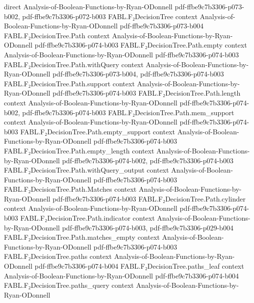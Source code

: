 \begin{theorem}
  {direct}
  {Analysis-of-Boolean-Functions-by-Ryan-ODonnell}
  {pdf-ffbe9c7b3306-p073-b002,
    pdf-ffbe9c7b3306-p072-b003}
\proofstep
  {FABL.F₂DecisionTree}
  {context}
  {Analysis-of-Boolean-Functions-by-Ryan-ODonnell}
  {pdf-ffbe9c7b3306-p073-b004}
\proofstep
  {FABL.F₂DecisionTree.Path}
  {context}
  {Analysis-of-Boolean-Functions-by-Ryan-ODonnell}
  {pdf-ffbe9c7b3306-p074-b003}
\proofstep
  {FABL.F₂DecisionTree.Path.empty}
  {context}
  {Analysis-of-Boolean-Functions-by-Ryan-ODonnell}
  {pdf-ffbe9c7b3306-p074-b003}
\proofstep
  {FABL.F₂DecisionTree.Path.withQuery}
  {context}
  {Analysis-of-Boolean-Functions-by-Ryan-ODonnell}
  {pdf-ffbe9c7b3306-p073-b004,
    pdf-ffbe9c7b3306-p074-b003}
\proofstep
  {FABL.F₂DecisionTree.Path.support}
  {context}
  {Analysis-of-Boolean-Functions-by-Ryan-ODonnell}
  {pdf-ffbe9c7b3306-p074-b003}
\proofstep
  {FABL.F₂DecisionTree.Path.length}
  {context}
  {Analysis-of-Boolean-Functions-by-Ryan-ODonnell}
  {pdf-ffbe9c7b3306-p074-b002,
    pdf-ffbe9c7b3306-p074-b003}
\proofstep
  {FABL.F₂DecisionTree.Path.mem_support}
  {context}
  {Analysis-of-Boolean-Functions-by-Ryan-ODonnell}
  {pdf-ffbe9c7b3306-p074-b003}
\proofstep
  {FABL.F₂DecisionTree.Path.empty_support}
  {context}
  {Analysis-of-Boolean-Functions-by-Ryan-ODonnell}
  {pdf-ffbe9c7b3306-p074-b003}
\proofstep
  {FABL.F₂DecisionTree.Path.empty_length}
  {context}
  {Analysis-of-Boolean-Functions-by-Ryan-ODonnell}
  {pdf-ffbe9c7b3306-p074-b002,
    pdf-ffbe9c7b3306-p074-b003}
\proofstep
  {FABL.F₂DecisionTree.Path.withQuery_output}
  {context}
  {Analysis-of-Boolean-Functions-by-Ryan-ODonnell}
  {pdf-ffbe9c7b3306-p074-b003}
\proofstep
  {FABL.F₂DecisionTree.Path.Matches}
  {context}
  {Analysis-of-Boolean-Functions-by-Ryan-ODonnell}
  {pdf-ffbe9c7b3306-p074-b003}
\proofstep
  {FABL.F₂DecisionTree.Path.cylinder}
  {context}
  {Analysis-of-Boolean-Functions-by-Ryan-ODonnell}
  {pdf-ffbe9c7b3306-p074-b003}
\proofstep
  {FABL.F₂DecisionTree.Path.indicator}
  {context}
  {Analysis-of-Boolean-Functions-by-Ryan-ODonnell}
  {pdf-ffbe9c7b3306-p074-b003,
    pdf-ffbe9c7b3306-p029-b004}
\proofstep
  {FABL.F₂DecisionTree.Path.matches_empty}
  {context}
  {Analysis-of-Boolean-Functions-by-Ryan-ODonnell}
  {pdf-ffbe9c7b3306-p074-b003}
\proofstep
  {FABL.F₂DecisionTree.paths}
  {context}
  {Analysis-of-Boolean-Functions-by-Ryan-ODonnell}
  {pdf-ffbe9c7b3306-p074-b004}
\proofstep
  {FABL.F₂DecisionTree.paths_leaf}
  {context}
  {Analysis-of-Boolean-Functions-by-Ryan-ODonnell}
  {pdf-ffbe9c7b3306-p074-b004}
\proofstep
  {FABL.F₂DecisionTree.paths_query}
  {context}
  {Analysis-of-Boolean-Functions-by-Ryan-ODonnell}

\end{theorem}
